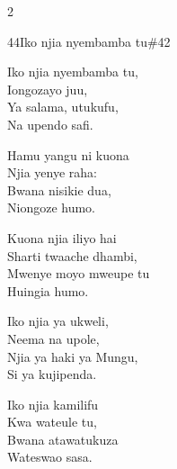 \documentclass{article}
\begin{document}
\begin{multicols}{2}
\begin{hymn}{44}{Iko njia nyembamba tu}{\#42}
\begin{stanza}
Iko njia nyembamba tu,\\
Iongozayo juu,\\
Ya salama, utukufu,\\
Na upendo safi.
\end{stanza}
\begin{chorus}
Hamu yangu ni kuona\\
Njia yenye raha:\\
Bwana nisikie dua,\\
Niongoze humo.
\end{chorus}
\begin{stanza}
Kuona njia iliyo hai\\
Sharti twaache dhambi,\\
Mwenye moyo mweupe tu\\
Huingia humo.
\end{stanza}
\begin{stanza}
Iko njia ya ukweli,\\
Neema na upole,\\
Njia ya haki ya Mungu,\\
Si ya kujipenda.
\end{stanza}
\begin{stanza}
Iko njia kamilifu\\
Kwa wateule tu,\\
Bwana atawatukuza\\
Wateswao sasa.
\end{stanza}
\end{hymn}


\end{multicols}
\end{document}

